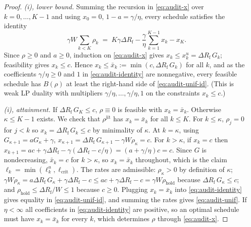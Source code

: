 \begin{proof}
\emph{(i), lower bound.} Summing the recursion in \eqref{eq:audit-x} over
$k=0,\dots,K-1$ and using $x_0=0$, $1-a=\gamma/\eta$, every schedule satisfies
the identity
\begin{equation}\label{eq:audit-identity}
  \gamma W\sum_{k<K}\rho_k \;=\; K\gamma\Delta R_{\mathrm f}-\frac{\gamma}{\eta}\sum_{k=1}^{K-1}x_k-x_K .
\end{equation}
Since $\rho\ge0$ and $a\ge0$, induction on \eqref{eq:audit-x} gives
$x_k\le x^u_k=\Delta R_{\mathrm f}\,G_k$; feasibility gives $x_k\le c$. Hence
$x_k\le\bar x_k:=\min(c,\Delta R_{\mathrm f}\,G_k)$ for all $k$, and as the coefficients
$\gamma/\eta\ge0$ and $1$ in \eqref{eq:audit-identity} are nonnegative, every
feasible schedule has $B(\rho)$ at least the right-hand side of
\eqref{eq:audit-unif-id}. (This is weak LP duality with multipliers
$\gamma/\eta,\dots,\gamma/\eta,1$ on the constraints $x_k\le c$.)

\emph{(i), attainment.} If $\Delta R_{\mathrm f}\,G_K\le c$, $\rho\equiv0$ is feasible with
$x_k=\bar x_k$. Otherwise $\kappa\le K-1$ exists. We check that
$\rho^{\mathrm{jit}}$ has $x_k=\bar x_k$ for all $k\le K$. For $k\le\kappa$,
$\rho_j=0$ for $j<k$ so $x_k=\Delta R_{\mathrm f}\,G_k\le c$ by minimality of $\kappa$.
At $k=\kappa$, using $G_{\kappa+1}=aG_\kappa+\gamma$,
$x_{\kappa+1}=\Delta R_{\mathrm f}\,G_{\kappa+1}-\gamma W\rho_\kappa=c$. For $k>\kappa$, if
$x_k=c$ then $x_{k+1}=ac+\gamma\Delta R_{\mathrm f}-\gamma(\Delta R_{\mathrm f}-c/\eta)=(a+\gamma/\eta)c=c$.
Since $G$ is nondecreasing, $\bar x_k=c$ for $k>\kappa$, so $x_k=\bar x_k$
throughout, which is the claim $\ell_k=\min(\ell^u_k,\ell_{\mathrm{crit}})$.
The rates are admissible: $\rho_\kappa>0$ by definition of $\kappa$;
$\gamma W\rho_\kappa=a\Delta R_{\mathrm f}\,G_\kappa+\gamma\Delta R_{\mathrm f}-c\le ac+\gamma\Delta R_{\mathrm f}-c
=\gamma W\rho_{\mathrm{hold}}$ because $\Delta R_{\mathrm f}\,G_\kappa\le c$; and
$\rho_{\mathrm{hold}}\le\Delta R_{\mathrm f}/W\le1$ because $c\ge0$. Plugging
$x_k=\bar x_k$ into \eqref{eq:audit-identity} gives equality in
\eqref{eq:audit-unif-id}, and summing the rates gives \eqref{eq:audit-unif}.
If $\eta<\infty$ all coefficients in \eqref{eq:audit-identity} are positive, so
an optimal schedule must have $x_k=\bar x_k$ for every $k$, which determines
$\rho$ through \eqref{eq:audit-x}.


\end{proof}

